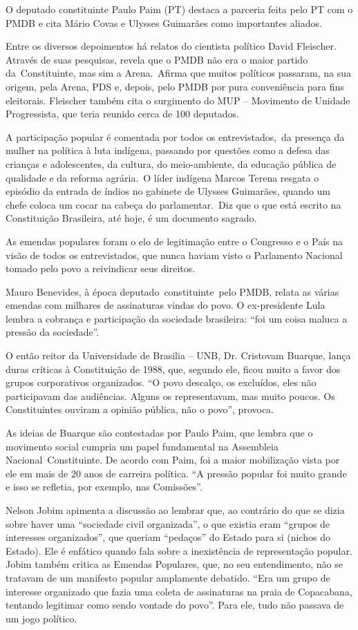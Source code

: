 O deputado constituinte Paulo Paim (PT) destaca a parceria feita pelo PT
com o PMDB e cita Mário Covas e Ulysses Guimarães como importantes
aliados.

Entre os diversos depoimentos há relatos do cientista político David
Fleischer. Através de suas pesquisas, revela que o PMDB não era o maior
partido da~Constituinte, mas sim a Arena.~Afirma que muitos políticos
passaram, na sua origem, pela Arena, PDS e, depois, pelo PMDB por pura
conveniência para fins eleitorais. Fleischer também cita o surgimento do
MUP -- Movimento de Unidade Progressista, que teria reunido cerca de 100
deputados.

A participação popular é comentada por todos os entrevistados,~da
presença da mulher na política à luta indígena, passando por questões
como a defesa das crianças e adolescentes, da cultura, do meio-ambiente,
da educação pública de qualidade e da reforma agrária.~O líder indígena
Marcos Terena resgata o episódio da entrada de índios no gabinete de
Ulysses Guimarães, quando um chefe coloca um cocar na cabeça do
parlamentar.~Diz que o que está escrito na Constituição Brasileira, até
hoje, é um documento sagrado.

As emendas populares foram o elo de legitimação entre o Congresso e o
País na visão de todos os entrevistados, que nunca haviam visto o
Parlamento Nacional tomado pelo povo a reivindicar seus direitos.

Mauro Benevides, à época deputado~constituinte~pelo PMDB, relata as
várias emendas com milhares de assinaturas vindas do povo. O
ex-presidente Lula lembra a cobrança e participação da sociedade
brasileira: ``foi um coisa maluca a pressão da sociedade''.

O então reitor da Universidade de Brasilia -- UNB, Dr. Cristovam
Buarque, lança duras críticas à Constituição de 1988, que, segundo ele,
ficou muito a favor dos grupos corporativos organizados. ``O povo
descalço, os excluídos, eles não participavam das audiências. Alguns os
representavam, mas muito poucos. Os Constituintes ouviram a opinião
pública, não o povo'', provoca.

As ideias de Buarque são contestadas por Paulo Paim, que lembra que o
movimento social cumpria um papel fundamental na Assembleia
Nacional~Constituinte. De acordo com Paim, foi a maior mobilização vista
por ele em mais de 20 anos de carreira política. ``A pressão popular foi
muito grande e isso se refletia, por exemplo, nas Comissões''.

Nelson Jobim apimenta a discussão ao lembrar que, ao contrário do que se
dizia sobre haver uma ``sociedade civil organizada'', o que existia eram
``grupos de interesses organizados'', que queriam ``pedaços'' do Estado
para si (nichos do Estado). Ele é enfático quando fala sobre a
inexistência de representação popular. Jobim também critica as Emendas
Populares, que, no seu entendimento, não se tratavam de um manifesto
popular amplamente debatido. ``Era um grupo de interesse organizado que
fazia uma coleta de assinaturas na praia de Copacabana, tentando
legitimar como sendo vontade do povo''. Para ele, tudo não passava de um
jogo político.

